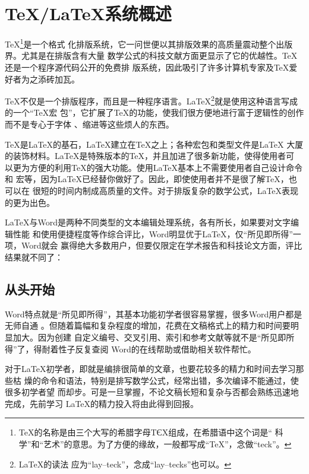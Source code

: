 \chapter{\TeX/\LaTeX{}系统概述}
\label{cha:overview}

\TeX{}\footnote{\TeX{}的名称是由三个大写的希腊字母ΤЄΧ组成，在希腊语中这个词是“
科学”和“艺术”的意思。为了方便的缘故，一般都写成“TeX”，念做“teck”。}是一个格式
化排版系统，它一问世便以其排版效果的高质量震动整个出版界。尤其是在排版含有大量
数学公式的科技文献方面更显示了它的优越性。\TeX{}还是一个程序源代码公开的免费排
版系统，因此吸引了许多计算机专家及\TeX{}爱好者为之添砖加瓦。

\TeX{}不仅是一个排版程序，而且是一种程序语言。\LaTeX{}\footnote{\LaTeX{}的读法
应为“lay--teck”，念成“lay--tecks”也可以。}就是使用这种语言写成的一个“\TeX{}宏
包”，它扩展了\TeX{}的功能，使我们很方便地进行富于逻辑性的创作而不是专心于字体
、缩进等这些烦人的东西。

\TeX{}是\LaTeX{}的基石，\LaTeX{}建立在\TeX{}之上；各种宏包和类型文件是\LaTeX{}
大厦的装饰材料。\LaTeX{}是特殊版本的\TeX{}，并且加进了很多新功能，使得使用者可
以更为方便的利用\TeX{}的强大功能。使用\LaTeX{}基本上不需要使用者自己设计命令和
宏等，因为\LaTeX{}已经替你做好了。因此，即使使用者并不是很了解\TeX{}，也可以在
很短的时间内制成高质量的文件。对于排版复杂的数学公式，\LaTeX{}表现的更为出色。

\LaTeX{}与Word是两种不同类型的文本编辑处理系统，各有所长，如果要对文字编辑性能
和使用便捷程度等作综合评比，Word明显优于\LaTeX{}，仅“所见即所得”一项，Word就会
赢得绝大多数用户，但要仅限定在学术报告和科技论文方面，评比结果就不同了：

\section*{从头开始}

Word特点就是“所见即所得”，其基本功能初学者很容易掌握，很多Word用户都是无师自通
。但随着篇幅和复杂程度的增加，花费在文稿格式上的精力和时间要明显加大。因为创建
自定义编号、交叉引用、索引和参考文献等就不是“所见即所得”了，得耐着性子反复查阅
Word的在线帮助或借助相关软件帮忙。

对于\LaTeX{}初学者，即就是编排很简单的文章，也要花较多的精力和时间去学习那些枯
燥的命令和语法，特别是排写数学公式，经常出错，多次编译不能通过，使很多初学者望
而却步。可是一旦掌握，不论文稿长短和复杂与否都会熟练迅速地完成，先前学习
\LaTeX{}的精力投入将由此得到回报。

